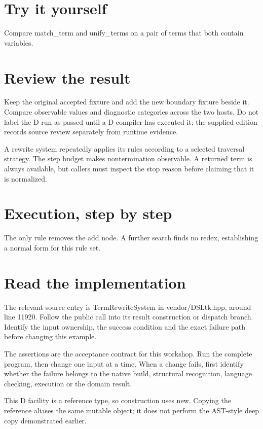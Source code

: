 \section*{Try it yourself}
Compare match\_term and unify\_terms on a pair of terms that both contain variables.

\section*{Review the result}
Keep the original accepted fixture and add the new boundary fixture beside it. Compare observable values and diagnostic categories across the two hosts. Do not label the D run as passed until a D compiler has executed it; the supplied edition records source review separately from runtime evidence.

\clearpage
{}
A rewrite system repeatedly applies its rules according to a selected traversal strategy. The step budget makes nontermination observable. A returned term is always available, but callers must inspect the stop reason before claiming that it is normalized.


\section*{Execution, step by step}
The only rule removes the add node. A further search finds no redex, establishing a normal form for this rule set.

\section*{Read the implementation}
The relevant source entry is TermRewriteSystem in vendor/DSLtk.hpp, around line 11920. Follow the public call into its result construction or dispatch branch. Identify the input ownership, the success condition and the exact failure path before changing this example.

The assertions are the acceptance contract for this workshop. Run the complete program, then change one input at a time. When a change fails, first identify whether the failure belongs to the native build, structural recognition, language checking, execution or the domain result.

\clearpage
{}
This D facility is a reference type, so construction uses new. Copying the reference aliases the same mutable object; it does not perform the AST-style deep copy demonstrated earlier.

